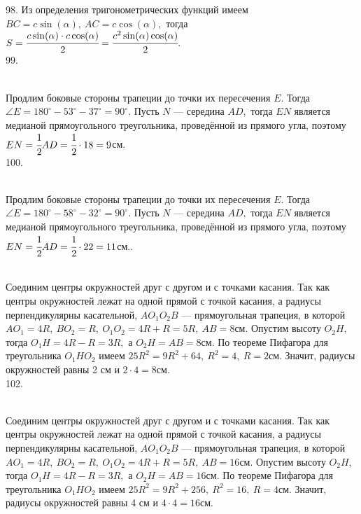 98. Из определения тригонометрических функций имеем $BC=c\sin(\alpha),\ AC=c\cos(\alpha),$ тогда $S=\cfrac{c\sin(\alpha)\cdot c\cos(\alpha)}{2}=\cfrac{c^2\sin(\alpha)\cos(\alpha)}{2}.$\\
99. \begin{figure}[ht!]
\end{figure}\\
Продлим боковые стороны трапеции до точки их пересечения $E.$ Тогда $\angle E=180^\circ-53^\circ-37^\circ=90^\circ.$ Пусть $N$ --- середина $AD,$ тогда $EN$ является медианой прямоугольного треугольника, проведённой из прямого угла, поэтому $EN=\cfrac{1}{2}AD=\cfrac{1}{2}\cdot18=9$см.\\
100. \begin{figure}[ht!]
\end{figure}\\
Продлим боковые стороны трапеции до точки их пересечения $E.$ Тогда $\angle E=180^\circ-58^\circ-32^\circ=90^\circ.$ Пусть $N$ --- середина $AD,$ тогда $EN$ является медианой прямоугольного треугольника, проведённой из прямого угла, поэтому $EN=\cfrac{1}{2}AD=\cfrac{1}{2}\cdot22=11$см.\newpage{}. \begin{figure}[ht!]
\end{figure}\\
Соединим центры окружностей друг с другом и с точками касания. Так как центры окружностей лежат на одной прямой с точкой касания, а радиусы перпендикулярны касательной, $AO_1O_2B$ --- прямоугольная трапеция, в которой $AO_1=4R,\ BO_2=R,\ O_1O_2=4R+R=5R,\ AB=8$см. Опустим высоту $O_2H,$ тогда $O_1H=4R-R=3R,$ а $O_2H=AB=8$см. По теореме Пифагора для треугольника $O_1HO_2$ имеем $25R^2=9R^2+64,\ R^2=4,\ R=2$см. Значит, радиусы окружностей равны 2 см и $2\cdot4=8$см.\\
102. \begin{figure}[ht!]
\end{figure}\\
Соединим центры окружностей друг с другом и с точками касания. Так как центры окружностей лежат на одной прямой с точкой касания, а радиусы перпендикулярны касательной, $AO_1O_2B$ --- прямоугольная трапеция, в которой $AO_1=4R,\ BO_2=R,\ O_1O_2=4R+R=5R,\ AB=16$см. Опустим высоту $O_2H,$ тогда $O_1H=4R-R=3R,$ а $O_2H=AB=16$см. По теореме Пифагора для треугольника $O_1HO_2$ имеем $25R^2=9R^2+256,\ R^2=16,\ R=4$см. Значит, радиусы окружностей равны 4 см и $4\cdot4=16$см.\\
